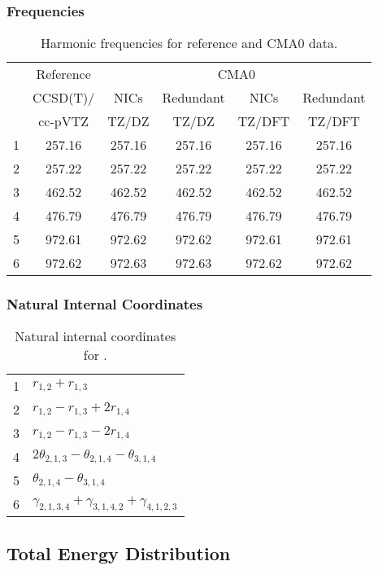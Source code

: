 \documentclass[10pt,oneside]{article}
\begin{document}
\begin{table}[h!]
\subsubsection*{Frequencies}
\centering
\caption{Harmonic frequencies for reference and CMA0 data.}
\begin{tabular}{cccccc}
\toprule
{} & Reference & \multicolumn{4}{c}{CMA0} \\
{} &  CCSD(T)/ &   NICs &  Redundant &   NICs & Redundant \\
{} &   cc-pVTZ &  TZ/DZ &      TZ/DZ & TZ/DFT &    TZ/DFT \\
\midrule
1 &    257.16 & 257.16 &     257.16 & 257.16 &    257.16 \\
2 &    257.22 & 257.22 &     257.22 & 257.22 &    257.22 \\
3 &    462.52 & 462.52 &     462.52 & 462.52 &    462.52 \\
4 &    476.79 & 476.79 &     476.79 & 476.79 &    476.79 \\
5 &    972.61 & 972.62 &     972.62 & 972.61 &    972.61 \\
6 &    972.62 & 972.63 &     972.63 & 972.62 &    972.62 \\
\bottomrule
\end{tabular}
\end{table}

\begin{table}[h!]
\subsubsection*{Natural Internal Coordinates}
\centering
\caption{Natural internal coordinates for .}
\small
\begin{tabular}{ll}
\toprule
  1   & $r_{1,2} + r_{1,3}$ \\
  2   & $r_{1,2} - r_{1,3} + 2r_{1,4}$ \\
  3   & $r_{1,2} - r_{1,3} - 2r_{1,4}$ \\
  4   & $2\theta_{2,1,3} - \theta_{2,1,4} - \theta_{3,1,4}$ \\
  5   & $\theta_{2,1,4} - \theta_{3,1,4}$ \\
  6   & $\gamma_{2,1,3,4} + \gamma_{3,1,4,2} + \gamma_{4,1,2,3}$ \\
\bottomrule
\end{tabular}
\end{table}

\begin{table}
\subsection*{Total Energy Distribution}
\centering\end{table}
\end{document}
